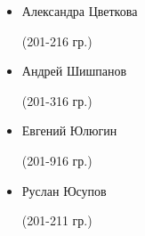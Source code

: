 \begin{multicols}{2}
\begin{small}
\begin{itemize}[leftmargin=0.5em]
	\item[] Александра Цветкова\begin{tiny} (201-216 гр.)\end{tiny}

	\item[] Андрей Шишпанов\begin{tiny} (201-316 гр.)\end{tiny} %

	\item[] Евгений Юлюгин\begin{tiny} (201-916 гр.)\end{tiny}
	\item[] Руслан Юсупов\begin{tiny} (201-211 гр.)\end{tiny}
\end{itemize}
\end{small}
\end{multicols}